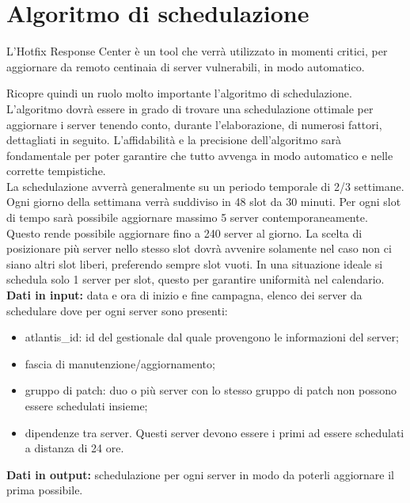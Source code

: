 %
%
\section{Algoritmo di schedulazione}
L’Hotfix Response Center è un tool che verrà utilizzato in momenti 
critici, per aggiornare da remoto centinaia di server vulnerabili, 
in modo automatico.

Ricopre quindi un ruolo molto importante l’algoritmo di schedulazione. 
L’algoritmo dovrà essere in grado di trovare una schedulazione 
ottimale per aggiornare i server tenendo conto, durante l'elaborazione, 
di numerosi fattori, dettagliati in seguito. L’affidabilità e la 
precisione dell’algoritmo sarà fondamentale per poter garantire che 
tutto avvenga in modo automatico e nelle corrette tempistiche.\\

La schedulazione avverrà generalmente su un periodo temporale 
di 2/3 settimane. Ogni giorno della settimana verrà suddiviso in 48 
slot da 30 minuti. Per ogni slot di tempo sarà possibile aggiornare 
massimo 5 server contemporaneamente. Questo rende possibile aggiornare 
fino a 240 server al giorno. La scelta di posizionare più server nello 
stesso slot dovrà avvenire solamente nel caso non ci siano altri slot 
liberi, preferendo sempre slot vuoti. In una situazione ideale si schedula 
solo 1 server per slot, questo per garantire uniformità nel calendario.\\

\textbf{Dati in input:} data e ora di inizio e fine campagna, elenco dei 
server da schedulare dove per ogni server sono presenti:
\begin{itemize}
\item atlantis\_id: id del gestionale dal quale provengono le informazioni del server;
\item fascia di manutenzione/aggiornamento;
\item gruppo di patch: duo o più server con lo stesso gruppo di patch non possono 
essere schedulati insieme;
\item dipendenze tra server. Questi server devono essere i primi ad essere 
schedulati a distanza di 24 ore.
\end{itemize}

\textbf{Dati in output:} schedulazione per ogni server in modo da poterli 
aggiornare il prima possibile.


